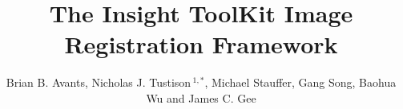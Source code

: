 \documentclass{frontiersSCNS}
\def\firstAuthorLast{Avants and Gee} %
\def\Authors{Brian B. Avants, Nicholas J. Tustison\,$^{1,*}$, Michael
  Stauffer, Gang Song, Baohua Wu and James C. Gee}
\begin{document}
\onecolumn
{}

\title[ITKv4 Image Registration]{The Insight ToolKit Image
  Registration Framework}
\author[\firstAuthorLast ]{\Authors}
\address{}
\correspondance{}
\editor{}
\topic{}

\maketitle

\end{document}
